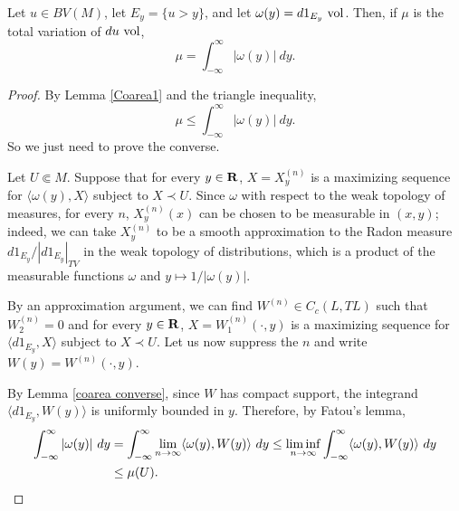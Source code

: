 \begin{proposition}\label{Coarea2}
Let $u \in BV(M)$, let $E_y = \{u > y\}$, and let $\omega(y) = d1_{E_y} ~\mathrm{vol}$.
Then, if $\mu$ is the total variation of $du ~\mathrm{vol}$,
$$\mu = \int_{-\infty}^\infty |\omega(y)| ~dy.$$
\end{proposition}
\begin{proof}
By Lemma \ref{Coarea1} and the triangle inequality,
$$\mu \leq \int_{-\infty}^\infty |\omega(y)| ~dy.$$
So we just need to prove the converse.

Let $U \Subset M$.
Suppose that for every $y \in \mathbf{R}$, $X = X^{(n)}_y$ is a maximizing sequence for $\langle \omega(y), X\rangle$ subject to $X \prec U$.
Since $\omega$ with respect to the weak topology of measures, for every $n$, $X^{(n)}_y(x)$ can be chosen to be measurable in $(x, y)$; indeed, we can take $X^{(n)}_y$ to be a smooth approximation to the Radon measure $d 1_{E_y}/|d 1_{E_y}|_{TV}$ in the weak topology of distributions, which is a product of the measurable functions $\omega$ and $y \mapsto 1/|\omega(y)|$.

By an approximation argument, we can find $W^{(n)} \in C_c(L, TL)$ such that $W^{(n)}_2 = 0$ and for every $y \in \mathbf{R}$, $X = W^{(n)}_1(\cdot, y)$ is a maximizing sequence for $\langle d 1_{E_y}, X\rangle$ subject to $X \prec U$.
Let us now suppress the $n$ and write $W(y) = W^{(n)}(\cdot, y)$.

By Lemma \ref{coarea converse}, since $W$ has compact support, the integrand $\langle d 1_{E_y}, W(y)\rangle$ is uniformly bounded in $y$.
Therefore, by Fatou's lemma,
\begin{align*}
\int_{-\infty}^\infty |\omega(y)| ~dy &= \int_{-\infty}^\infty \lim_{n \to \infty} \langle \omega(y), W(y)\rangle ~dy \leq \liminf_{n \to \infty} \int_{-\infty}^\infty \langle \omega(y), W(y)\rangle ~dy \\
&\leq \mu(U). \qedhere
\end{align*}
\end{proof}
